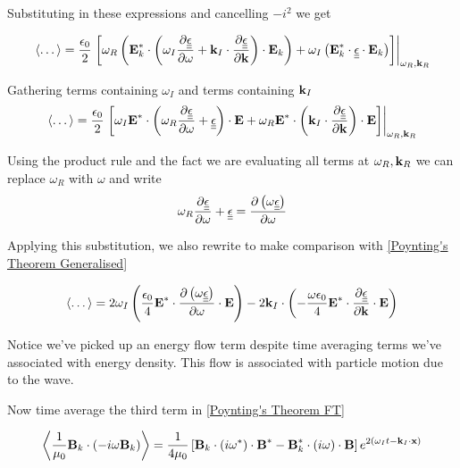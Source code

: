 Substituting in these expressions and cancelling $-i^2$ we get

\begin{equation}
	\left \langle \dots \right \rangle = \frac{\epsilon_0}{2} \left. \left[ \omega_R \left( \textbf{E}_k^* \cdot \left( \omega_I \frac{\partial \underline{\underline{\epsilon}}}{\partial \omega} + \textbf{k}_I \cdot \frac{\partial \underline{\underline{\epsilon}}}{\partial \textbf{k}} \right) \cdot \textbf{E}_k \right) + \omega_I \left( \textbf{E}_k^* \cdot \underline{\underline{\epsilon}} \cdot \textbf{E}_k \right) \right] \right|_{\omega_R, \textbf{k}_R}
\end{equation}

Gathering terms containing $\omega_I$ and terms containing $\textbf{k}_I$
\begin{equation}
	\left \langle \dots \right \rangle = \frac{\epsilon_0}{2} \left. \left[ \omega_I \textbf{E}^* \cdot \left( \omega_R \frac{\partial \underline{\underline{\epsilon}}}{\partial \omega} + \underline{\underline{\epsilon}} \right) \cdot \textbf{E} + \omega_R \textbf{E}^* \cdot \left( \textbf{k}_I \cdot \frac{\partial \underline{\underline{\epsilon}}}{\partial \textbf{k}} \right) \cdot \textbf{E} \right] \right|_{\omega_R, \textbf{k}_R}
\end{equation}

Using the product rule and the fact we are evaluating all terms at $\omega_R, \textbf{k}_R$ we can replace $\omega_R$ with $\omega$ and write
\begin{equation}
	\omega_R \frac{\partial \underline{\underline{\epsilon}}}{\partial \omega} + \underline{\underline{\epsilon}} = \frac{\partial \left( \omega \underline{\underline{\epsilon}} 	\right)}{\partial \omega}
\end{equation}

Applying this substitution, we also rewrite to make comparison with \eqref{Poynting's Theorem Generalised}

\begin{equation} \label{Poynting's Theorem Time Averaged E}
	\left \langle \dots \right \rangle = 2 \omega_I \left( \frac{\epsilon_0}{4} \textbf{E}^* \cdot \frac{\partial \left( \omega \underline{\underline{\epsilon}} \right)}{\partial \omega} \cdot \textbf{E} \right) - 2 \textbf{k}_I \cdot \left( - \frac{\omega \epsilon_0}{4} \textbf{E}^* \cdot \frac{\partial \underline{\underline{\epsilon}}}{\partial \textbf{k}} \cdot \textbf{E} \right)
\end{equation}

Notice we've picked up an energy flow term despite time averaging terms we've associated with energy density. This flow is associated with particle motion due to the wave.

Now time average the third term in \eqref{Poynting's Theorem FT}

\begin{equation}
	\left \langle \frac{1}{\mu_0} \textbf{B}_k \cdot \left( -i \omega \textbf{B}_k \right) \right \rangle = \frac{1}{4 \mu_0} \left[ \textbf{B}_k \cdot \left( i \omega^* \right) \cdot \textbf{B}^* - \textbf{B}_k^* \cdot \left( i \omega \right) \cdot \textbf{B} \right] e^{2 \left( \omega_I t - \textbf{k}_I \cdot \textbf{x} \right)}
\end{equation}

